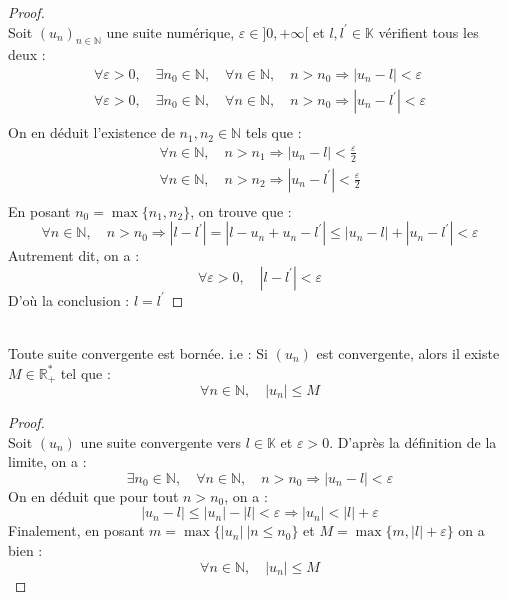     \begin{proof}
        \ \\
        Soit \((u_n)_{n\in\mathbb{N}}\) une suite numérique, \(\varepsilon \in ]0, +\infty[ \) et \(l, l^{\prime} \in \mathbb{K}\) vérifient tous les deux :
        \[
            \begin{array}{l}
                \forall \varepsilon > 0, \quad \exists n_0 \in \mathbb{N}, \quad \forall n \in \mathbb{N}, \quad n > n_0 \Rightarrow |u_n - l| < \varepsilon\\
                \forall \varepsilon > 0, \quad \exists n_0 \in \mathbb{N}, \quad \forall n \in \mathbb{N}, \quad n > n_0 \Rightarrow |u_n - l^{\prime}| < \varepsilon\\
            \end{array}
        \]
        On en déduit l'existence de \(n_1, n_2 \in \mathbb{N}\) tels que :
        \[
            \begin{array}{l}
                \forall n \in \mathbb{N},\quad n > n_1 \Rightarrow |u_n - l| < \frac{\varepsilon}{2}\\
                \forall n \in \mathbb{N},\quad n > n_2 \Rightarrow |u_n - l^{\prime}| < \frac{\varepsilon}{2}\\
            \end{array}    
        \]
        En posant \(n_0 = \max{\{n_1, n_2\}}\), on trouve que :
        \[
            \forall n \in \mathbb{N},\quad n > n_0 \Rightarrow |l - l^{\prime}| = |l - u_n + u_n - l^{\prime}| \le |u_n - l| + |u_n - l^{\prime}| < \varepsilon
        \]
        Autrement dit, on a :
        \[
            \forall \varepsilon > 0, \quad |l - l^{\prime}| < \varepsilon 
        \]
        D'où la conclusion : \(l = l^{\prime}\)
    \end{proof}

    \begin{theorem}
        \ \\
        Toute suite convergente est bornée. i.e : Si \((u_n)\) est convergente, alors il existe \(M \in \mathbb{R}^{*}_{+}\) tel que :
        \[\forall n \in \mathbb{N}, \quad |u_n| \le M\]
    \end{theorem}

    \begin{proof}
        \ \\
        Soit \((u_n)\) une suite convergente vers \(l \in \mathbb{K}\) et \(\varepsilon > 0\). D'après la définition de la limite, on a :
        \[
            \exists n_0 \in \mathbb{N}, \quad \forall n \in \mathbb{N}, \quad n > n_0 \Rightarrow |u_n - l| < \varepsilon    
        \]
        On en déduit que pour tout \(n>n_0\), on a :
        \[
            |u_n - l| \le |u_n| - |l| < \varepsilon \Rightarrow |u_n| < |l| +\varepsilon     
        \]
        Finalement, en posant \(m = \max{\{|u_n|\ | n \le n_0\}}\) et \(M = \max{\{m, |l| + \varepsilon\}}\) on a bien :
        \[\forall n \in \mathbb{N}, \quad |u_n| \le M\]
    \end{proof}

